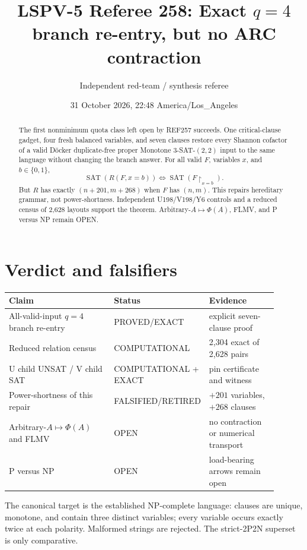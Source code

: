 \documentclass[11pt]{article}
\title{LSPV-5 Referee 258: Exact $q=4$ branch re-entry, but no ARC contraction}
\author{Independent red-team / synthesis referee}
\date{31 October 2026, 22:48 America/Los\_Angeles}
\newcommand{\status}[1]{\textsf{#1}}
\begin{document}
\maketitle

\begin{abstract}
The first nonminimum quota class left open by REF257 succeeds.  One critical-clause gadget, four fresh balanced variables, and seven clauses restore every Shannon cofactor of a valid D\"ocker duplicate-free proper Monotone 3-SAT-$(2,2)$ input to the same language without changing the branch answer.  For all valid $F$, variables $x$, and $b\in\{0,1\}$,
\[
\operatorname{SAT}(R(F,x=b))\iff\operatorname{SAT}(F\!\upharpoonright_{x=b}).
\]
But $R$ has exactly $(n+201,m+268)$ when $F$ has $(n,m)$.  This repairs hereditary grammar, not power-shortness.  Independent U198/V198/Y6 controls and a reduced census of 2,628 layouts support the theorem.  Arbitrary-$A\mapsto\Phi(A)$, FLMV, and P versus NP remain \status{OPEN}.
\end{abstract}

\section{Verdict and falsifiers}
\begin{center}
\begin{tabular}{p{0.43\linewidth}p{0.20\linewidth}p{0.27\linewidth}}
\toprule
Claim & Status & Evidence\\
\midrule
All-valid-input $q=4$ branch re-entry & \status{PROVED/EXACT} & explicit seven-clause proof\\
Reduced relation census & \status{COMPUTATIONAL} & 2,304 exact of 2,628 pairs\\
U child UNSAT / V child SAT & \status{COMPUTATIONAL + EXACT} & pin certificate and witness\\
Power-shortness of this repair & \status{FALSIFIED/RETIRED} & $+201$ variables, $+268$ clauses\\
Arbitrary-$A\mapsto\Phi(A)$ and FLMV & \status{OPEN} & no contraction or numerical transport\\
P versus NP & \status{OPEN} & load-bearing arrows remain open\\
\bottomrule
\end{tabular}
\end{center}

The canonical target is the established NP-complete language: clauses are unique, monotone, and contain three distinct variables; every variable occurs exactly twice at each polarity.  Malformed strings are rejected.  The strict-2P2N superset is only comparative.
\end{document}
